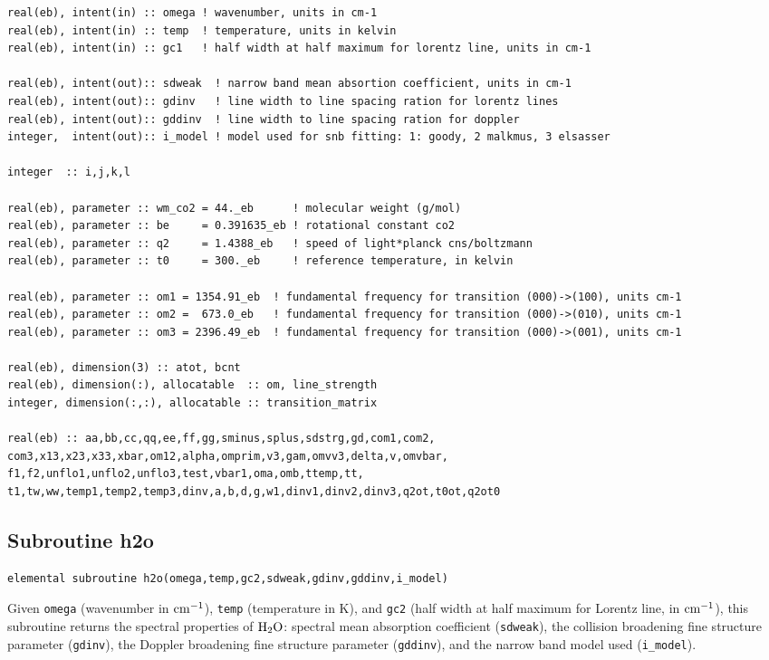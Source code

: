 \begin{lstlisting}
real(eb), intent(in) :: omega ! wavenumber, units in cm-1
real(eb), intent(in) :: temp  ! temperature, units in kelvin
real(eb), intent(in) :: gc1   ! half width at half maximum for lorentz line, units in cm-1

real(eb), intent(out):: sdweak  ! narrow band mean absortion coefficient, units in cm-1
real(eb), intent(out):: gdinv   ! line width to line spacing ration for lorentz lines
real(eb), intent(out):: gddinv  ! line width to line spacing ration for doppler
integer,  intent(out):: i_model ! model used for snb fitting: 1: goody, 2 malkmus, 3 elsasser

integer  :: i,j,k,l

real(eb), parameter :: wm_co2 = 44._eb      ! molecular weight (g/mol)
real(eb), parameter :: be     = 0.391635_eb ! rotational constant co2
real(eb), parameter :: q2     = 1.4388_eb   ! speed of light*planck cns/boltzmann
real(eb), parameter :: t0     = 300._eb     ! reference temperature, in kelvin

real(eb), parameter :: om1 = 1354.91_eb  ! fundamental frequency for transition (000)->(100), units cm-1
real(eb), parameter :: om2 =  673.0_eb   ! fundamental frequency for transition (000)->(010), units cm-1
real(eb), parameter :: om3 = 2396.49_eb  ! fundamental frequency for transition (000)->(001), units cm-1

real(eb), dimension(3) :: atot, bcnt
real(eb), dimension(:), allocatable  :: om, line_strength
integer, dimension(:,:), allocatable :: transition_matrix

real(eb) :: aa,bb,cc,qq,ee,ff,gg,sminus,splus,sdstrg,gd,com1,com2,
com3,x13,x23,x33,xbar,om12,alpha,omprim,v3,gam,omvv3,delta,v,omvbar,
f1,f2,unflo1,unflo2,unflo3,test,vbar1,oma,omb,ttemp,tt,
t1,tw,ww,temp1,temp2,temp3,dinv,a,b,d,g,w1,dinv1,dinv2,dinv3,q2ot,t0ot,q2ot0
\end{lstlisting}

\subsection{Subroutine h2o}

\begin{lstlisting}
elemental subroutine h2o(omega,temp,gc2,sdweak,gdinv,gddinv,i_model)
\end{lstlisting}
Given \verb=omega= (wavenumber in $\rm cm^{-1}$), \verb=temp= (temperature in K), and \verb=gc2= (half width at half maximum for Lorentz line, in $\rm cm^{-1}$), this subroutine returns the spectral properties of $\rm H_2O$: spectral mean absorption coefficient (\verb=sdweak=), the collision broadening fine structure parameter (\verb=gdinv=), the Doppler broadening fine structure parameter (\verb=gddinv=), and the narrow band model used (\verb=i_model=).

